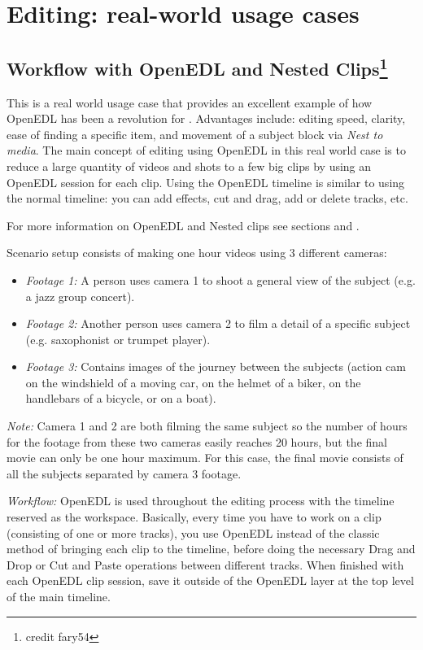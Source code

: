 \chapter{Editing: real-world usage cases}%
\label{cha:editing_real_world_usage}

\section{Workflow with OpenEDL and Nested Clips\protect\footnote{credit fary54}}%
\label{sec:workflow_openedl_nested_clips}

This is a real world usage case that provides an excellent example of how OpenEDL has been a
revolution for \CGG{}. Advantages include: editing speed, clarity, ease of finding a specific item,
and movement of a subject block via \textit{Nest to media}.
The main concept of editing using OpenEDL in this real world case is to
reduce a large quantity of videos and shots to a few big clips by using
an OpenEDL session for each clip. Using the OpenEDL timeline is similar to
 using the normal timeline: you can add effects, cut and drag, add or delete
tracks, etc.

For more information on OpenEDL and Nested clips see sections  and .

Scenario setup consists of making one hour videos using 3 different cameras:

\begin{itemize}
	\item \textit{Footage 1:} A person uses camera 1 to shoot a general view of the subject (e.g. a jazz group concert).
	\item \textit{Footage 2:} Another person uses camera 2 to film a detail of a specific subject (e.g. saxophonist or trumpet player).
	\item \textit{Footage 3:} Contains images of the journey between the subjects (action cam on the windshield of a moving car, on the helmet of a biker, on the handlebars of a bicycle, or on a boat).
\end{itemize}

\textit{Note:} Camera 1 and 2 are both filming the same subject so the number of hours for the footage from these two cameras easily reaches 20 hours, but the final movie can only be one hour maximum.  For this case, the final movie consists of all the subjects separated by camera 3 footage.

\textit{Workflow:} OpenEDL is used throughout the editing process with the timeline reserved as the workspace. Basically, every time you have to work on a clip (consisting of one or more tracks), you use OpenEDL instead of the classic method of bringing each clip to the timeline, before doing the necessary Drag and Drop or Cut and Paste operations between different tracks. When finished with each
OpenEDL clip session, save it outside of the OpenEDL layer at the top level of the main timeline.

